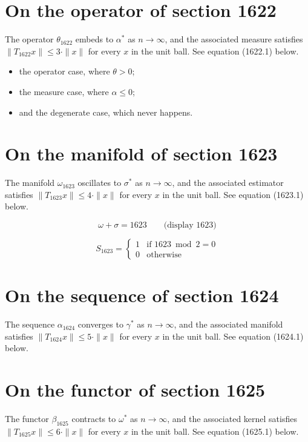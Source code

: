 \documentclass{article}
\begin{document}
\section{On the operator of section 1622}
The operator $\theta_{1622}$ embeds to $\alpha^{*}$ as $n \to \infty$,
and the associated measure satisfies $\|T_{1622} x\| \leq 3 \cdot \|x\|$
for every $x$ in the unit ball. See equation (1622.1) below.

\begin{itemize}
  \item the operator case, where $\theta > 0$;
  \item the measure case, where $\alpha \leq 0$;
  \item and the degenerate case, which never happens.
\end{itemize}

\section{On the manifold of section 1623}
The manifold $\omega_{1623}$ oscillates to $\sigma^{*}$ as $n \to \infty$,
and the associated estimator satisfies $\|T_{1623} x\| \leq 4 \cdot \|x\|$
for every $x$ in the unit ball. See equation (1623.1) below.

$$
\omega + \sigma = 1623 \qquad \text{(display 1623)}
$$

\begin{equation}
S_{1623} = \begin{cases} 1 & \text{if } 1623 \bmod 2 = 0 \\ 0 & \text{otherwise} \end{cases}
\end{equation}

\section{On the sequence of section 1624}
The sequence $\alpha_{1624}$ converges to $\gamma^{*}$ as $n \to \infty$,
and the associated manifold satisfies $\|T_{1624} x\| \leq 5 \cdot \|x\|$
for every $x$ in the unit ball. See equation (1624.1) below.

\section{On the functor of section 1625}
The functor $\beta_{1625}$ contracts to $\omega^{*}$ as $n \to \infty$,
and the associated kernel satisfies $\|T_{1625} x\| \leq 6 \cdot \|x\|$
for every $x$ in the unit ball. See equation (1625.1) below.
\end{document}
